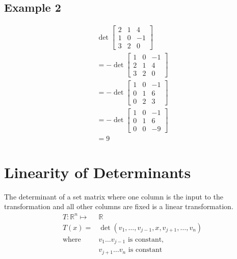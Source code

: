 \documentclass{article}
\theoremstyle{mytheoremstyle}
\theoremstyle{mytheoremstyle}
\theoremstyle{myproblemstyle}
\begin{document}
    \subsection*{Example 2}
    \begin{align*}
        \det \begin{bmatrix}
            2 & 1 & 4 \\
            1 & 0 & -1 \\
            3 & 2 & 0
        \end{bmatrix} \\
        = -\det \begin{bmatrix}
            1 & 0 & -1 \\
            2 & 1 & 4 \\
            3 & 2 & 0
        \end{bmatrix} \\
        = -\det \begin{bmatrix}
            1 & 0 & -1 \\
            0 & 1 & 6 \\
            0 & 2 & 3
        \end{bmatrix} \\
        = -\det \begin{bmatrix}
            1 & 0 & -1 \\
            0 & 1 & 6 \\
            0 & 0 & -9
        \end{bmatrix} \\
        = 9
    \end{align*}

    \section*{Linearity of Determinants}
    The determinant of a set matrix where one column is the input to the
    transformation and all other columns are fixed is a linear transformation.
    \begin{align*}
        T: \mathbb{R}^n \mapsto& \mathbb{R}\\
        T(x) =& \det(v_1,\dots,v_{j-1},x,v_{j+1},\dots,v_n) \\
        \text{where }& v_1\dots v_{j-1} \text{ is constant,} \\
                     & v_{j+1}\dots v_n \text{ is constant}
    \end{align*}
\end{document}
